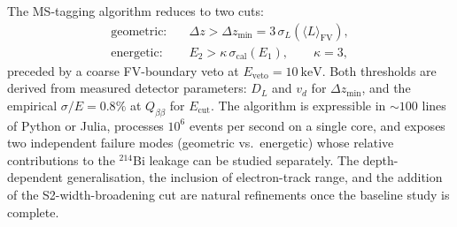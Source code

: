 \documentclass[11pt,a4paper]{article}
\begin{document}
The MS-tagging algorithm reduces to two cuts:
\begin{align*}
\text{geometric:} \quad & \Delta z > \Delta z_{\min}
                          = 3\,\sigma_L(\langle L\rangle_{\mathrm{FV}}), \\
\text{energetic:} \quad & E_2 > \kappa\,\sigma_{\mathrm{cal}}(E_1),
                          \qquad \kappa = 3,
\end{align*}
preceded by a coarse FV-boundary veto at $E_{\mathrm{veto}} =
\SI{10}{\keV}$. Both thresholds are derived from measured detector
parameters: $D_L$ and $v_d$ for $\Delta z_{\min}$, and the empirical
$\sigma/E = 0.8\%$ at $Q_{\beta\beta}$ for $E_{\mathrm{cut}}$. The
algorithm is expressible in $\sim\!100$ lines of Python or Julia,
processes $10^{6}$ events per second on a single core, and exposes
two independent failure modes (geometric vs.\ energetic) whose
relative contributions to the $^{214}$Bi leakage can be studied
separately. The depth-dependent generalisation, the inclusion of
electron-track range, and the addition of the S2-width-broadening
cut are natural refinements once the baseline study is complete.
\end{document}
